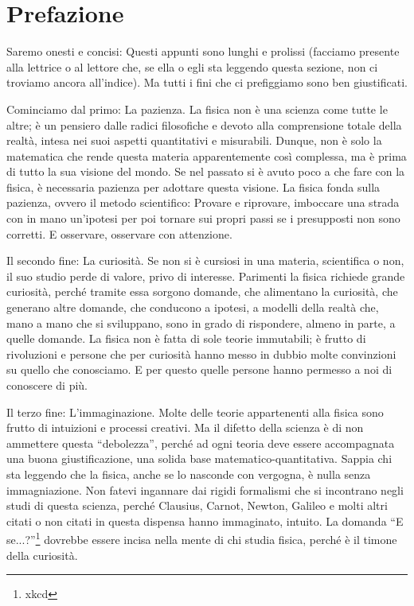 \section*{Prefazione}
Saremo onesti e concisi: Questi appunti sono lunghi e prolissi (facciamo presente
alla lettrice o al lettore che, se ella o egli sta leggendo questa sezione,
non ci troviamo ancora all'indice). Ma tutti i fini che ci prefiggiamo sono ben
giustificati.

Cominciamo dal primo: La pazienza. La fisica non è una scienza come tutte le altre;
è un pensiero dalle radici filosofiche e devoto alla comprensione totale della
realtà, intesa nei suoi aspetti quantitativi e misurabili. Dunque, non è solo la
matematica che rende questa materia apparentemente così complessa, ma è prima di
tutto la sua visione del mondo. Se nel passato si è avuto poco a che fare con la
fisica, è necessaria pazienza per adottare questa visione. La fisica fonda sulla
pazienza, ovvero il metodo scientifico: Provare e riprovare, imboccare una strada
con in mano un'ipotesi per poi tornare sui propri passi se i presupposti non sono
corretti. E osservare, osservare con attenzione.

Il secondo fine: La curiosità. Se non si è cursiosi in una materia, scientifica o
non, il suo studio perde di valore, privo di interesse. Parimenti la fisica richiede
grande curiosità, perché tramite essa sorgono domande, che alimentano la curiosità,
che generano altre domande, che conducono a ipotesi, a modelli della realtà che,
mano a mano che si sviluppano, sono in grado di rispondere, almeno in parte, a
quelle domande. La fisica non è fatta di sole teorie immutabili; è frutto di rivoluzioni
e persone che per curiosità hanno messo in dubbio molte convinzioni su quello
che conosciamo. E per questo quelle persone hanno permesso a noi di conoscere di più.

Il terzo fine: L'immaginazione. Molte delle teorie appartenenti alla fisica
sono frutto di intuizioni e processi creativi. Ma il difetto della scienza è
di non ammettere questa ``debolezza'', perché ad ogni teoria deve essere
accompagnata una buona giustificazione, una solida base matematico-quantitativa.
Sappia chi sta leggendo che la fisica, anche se lo nasconde con vergogna, è
nulla senza immagniazione. Non fatevi ingannare dai rigidi formalismi che si
incontrano negli studi di questa scienza, perché Clausius, Carnot, Newton,
Galileo e molti altri citati o non citati in questa dispensa hanno immaginato,
intuito. La domanda ``E se...?''\footnote{xkcd} dovrebbe essere incisa nella mente
di chi studia fisica, perché è il timone della curiosità.
